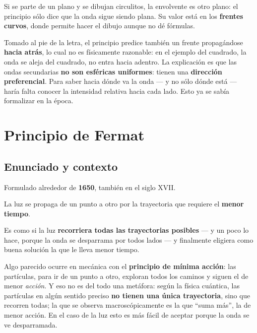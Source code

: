 \documentclass[12pt,a4paper]{article}
\begin{document}
\begin{notebox}
Si se parte de un plano y se dibujan circulitos, la envolvente es otro plano: el
principio sólo dice que la onda sigue siendo plana. Su valor está en los
\textbf{frentes curvos}, donde permite hacer el dibujo aunque no dé fórmulas.
\end{notebox}

\begin{warnbox}
Tomado al pie de la letra, el principio predice también un frente propagándose
\textbf{hacia atrás}, lo cual no es físicamente razonable: en el ejemplo del
cuadrado, la onda se aleja del cuadrado, no entra hacia adentro. La explicación
es que las ondas secundarias \textbf{no son esféricas uniformes}: tienen una
\textbf{dirección preferencial}. Para saber hacia dónde va la onda --- y no sólo
dónde está --- haría falta conocer la intensidad relativa hacia cada lado. Esto ya
se sabía formalizar en la época.
\end{warnbox}

\section{Principio de Fermat}

\subsection{Enunciado y contexto}

Formulado alrededor de \textbf{1650}, también en el siglo XVII.

\begin{keybox}
La luz se propaga de un punto a otro por la trayectoria que requiere el
\textbf{menor tiempo}.
\end{keybox}

Es como si la luz \textbf{recorriera todas las trayectorias posibles} --- y un
poco lo hace, porque la onda se desparrama por todos lados --- y finalmente
eligiera como buena solución la que le lleva menor tiempo.

\begin{notebox}
Algo parecido ocurre en mecánica con el \textbf{principio de mínima acción}: las
partículas, para ir de un punto a otro, exploran todos los caminos y siguen el de
menor \emph{acción}. Y eso no es del todo una metáfora: según la física cuántica,
las partículas en algún sentido preciso \textbf{no tienen una única
trayectoria}, sino que recorren todas; la que se observa macroscópicamente es la
que \enquote{suma más}, la de menor acción. En el caso de la luz esto es más
fácil de aceptar porque la onda se ve desparramada.
\end{notebox}
\end{document}
